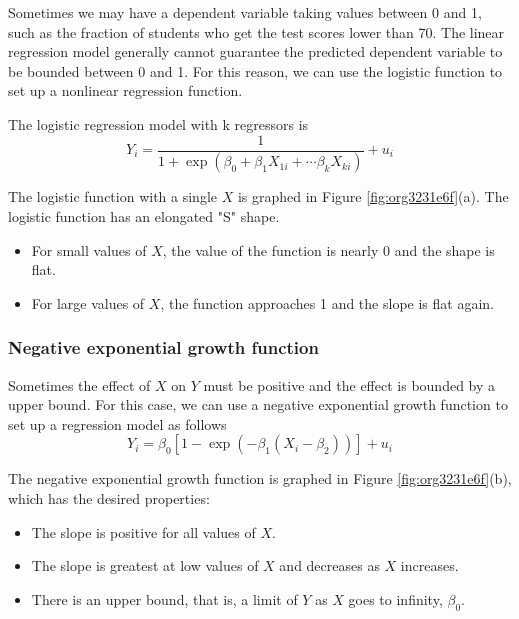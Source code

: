 \documentclass[a4paper,11pt]{article}
\begin{document}
Sometimes we may have a dependent variable taking values between 0 and
1, such as the fraction of students who get the test scores lower
than 70. The linear regression model generally cannot guarantee the
predicted dependent variable to be bounded between 0 and 1. For this
reason, we can use the logistic function to set up a nonlinear
regression function.

The logistic regression model with k regressors is
\begin{equation}
\label{eq:logistic}
Y_i = \frac{1}{1 + \exp(\beta_0 + \beta_1 X_{1i} + \cdots \beta_k X_{ki})} + u_i
\end{equation}

The logistic function with a single \(X\) is graphed in Figure \ref{fig:org3231e6f}(a). The
logistic function has an elongated "S" shape.
\begin{itemize}
\item For small values of \(X\), the value of the function is nearly 0 and
the shape is flat.
\item For large values of \(X\), the function approaches 1 and the slope is
flat again.
\end{itemize}

\subsubsection*{Negative exponential growth function}
\label{sec:org730b502}

Sometimes the effect of \(X\) on \(Y\) must be positive and the effect is
bounded by a upper bound. For this case, we can use a negative
exponential growth function to set up a regression model as follows
\begin{equation}
\label{eq:neg-exp}
Y_i = \beta_0 [1-\exp(-\beta_1(X_i - \beta_2))] + u_i
\end{equation}

The negative exponential growth function is graphed in Figure
\ref{fig:org3231e6f}(b), which has the desired properties:
\begin{itemize}
\item The slope is positive for all values of \(X\).
\item The slope is greatest at low values of \(X\) and decreases as \(X\)
increases.
\item There is an upper bound, that is, a limit of \(Y\) as \(X\) goes to
infinity, \(\beta_0\).
\end{itemize}
\end{document}
